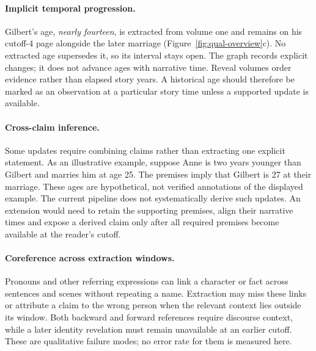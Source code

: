 \paragraph{Implicit temporal progression.}
Gilbert's age, \emph{nearly fourteen}, is extracted from volume one and remains on his
cutoff-4 page alongside the later marriage (Figure~\ref{fig:qual-overview}c). No extracted
age supersedes it, so its interval stays open. The graph records explicit changes; it does
not advance ages with narrative time. Reveal volumes order evidence rather than elapsed
story years. A historical age should therefore be marked as an observation at a particular
story time unless a supported update is available.

\paragraph{Cross-claim inference.}
Some updates require combining claims rather than extracting one explicit statement.
As an illustrative example, suppose Anne is two years younger than Gilbert and marries
him at age 25. The premises imply that Gilbert is 27 at their marriage. These ages are
hypothetical, not verified annotations of the displayed example. The current pipeline
does not systematically derive such updates. An extension would need to retain the
supporting premises, align their narrative times and expose a derived claim only after
all required premises become available at the reader's cutoff.

\paragraph{Coreference across extraction windows.}
Pronouns and other referring expressions can link a character or fact across sentences
and scenes without repeating a name. Extraction may miss these links or attribute a
claim to the wrong person when the relevant context lies outside its window. Both backward
and forward references require discourse context, while a later identity revelation must
remain unavailable at an earlier cutoff. These are qualitative failure modes; no error
rate for them is measured here.
